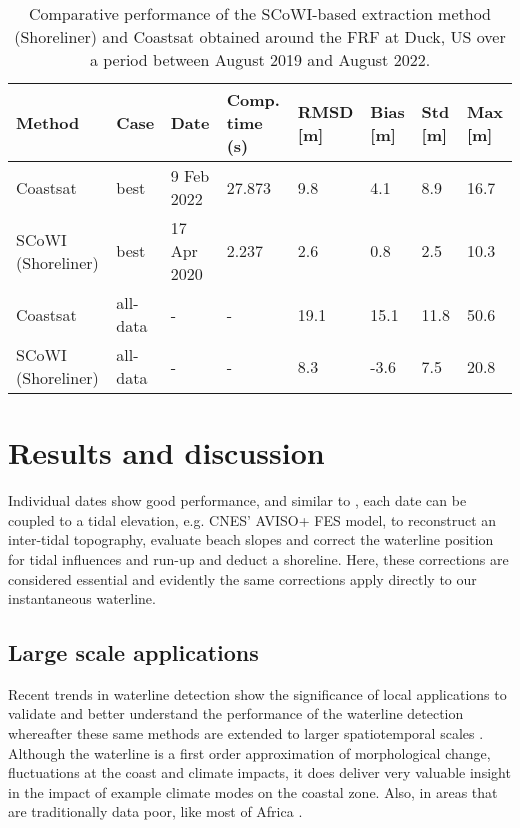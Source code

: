 \documentclass[remotesensing,article,submit,pdftex,moreauthors]{Definitions/mdpi}
\begin{document}
\begin{table}[H] 
\caption{Comparative performance of the SCoWI-based extraction method (Shoreliner) and Coastsat obtained around the FRF at Duck, US over a period between August 2019 and August 2022.\label{tab1}}
\begin{tabularx}{\textwidth}{CCCCCCCC}
\toprule
\textbf{Method}	& \textbf{Case} & Date & \textbf{Comp. time (s)} & \textbf{RMSD [m]} & \textbf{Bias [m]}  & \textbf{Std [m]} & \textbf{Max [m]}\\
\midrule
Coastsat            & best & 9 Feb 2022 & 27.873  & 9.8 & 4.1 &  8.9 & 16.7 \\
\footnotesize SCoWI (\textnormal{Shoreliner})  & best & 17 Apr 2020 & 2.237	   & 2.6  &  0.8 &  2.5 & 10.3\\
Coastsat            & all-data & -& -         & 19.1 & 15.1 & 11.8 & 50.6 \\
\footnotesize SCoWI (\textnormal{Shoreliner})  & all-data & - & -         & 8.3  & -3.6 &  7.5 & 20.8 \\
\bottomrule
\end{tabularx}
\end{table}

\section{Results and discussion}
Individual dates show good performance, and similar to \citet{VOS2019_google}, each date can be coupled to a tidal elevation, e.g. CNES' AVISO+ FES model, to reconstruct an inter-tidal topography, evaluate beach slopes and correct the waterline position for tidal influences and run-up and deduct a shoreline. Here, these corrections are considered essential and evidently the same corrections apply directly to our instantaneous waterline. 

\subsection{Large scale applications}
Recent trends in waterline detection show the significance of local applications to validate and better understand the performance of the waterline detection whereafter these same methods are extended to larger spatiotemporal scales \citep{VOS2019_sub, almar2023influence, Vos2023}. Although the waterline is a first order approximation of morphological change, fluctuations at the coast and climate impacts, it does deliver very valuable insight in the impact of example climate modes on the coastal zone. Also, in areas that are traditionally data poor, like most of Africa \citep{almar2022coastal}.  
\end{document}

